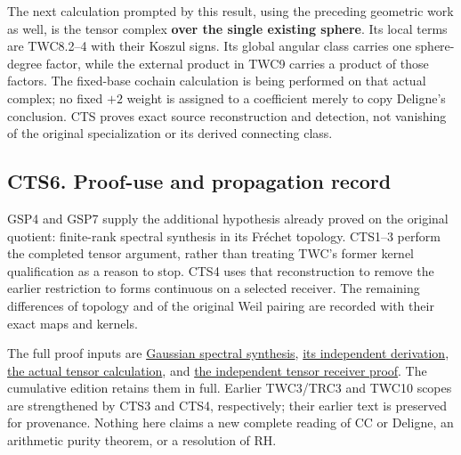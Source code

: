 The next calculation prompted by this result, using the preceding
geometric work as well, is the tensor complex \textbf{over the single
existing sphere}. Its local terms are TWC8.2--4 with their Koszul signs.
Its global angular class carries one sphere-degree factor, while the
external product in TWC9 carries a product of those factors. The
fixed-base cochain calculation is being performed on that actual
complex; no fixed \(+2\) weight is assigned to a coefficient merely to
copy Deligne's conclusion. CTS proves exact source reconstruction and
detection, not vanishing of the original specialization or its derived
connecting class.

\subsection{CTS6. Proof-use and propagation
record}\label{cts6.-proof-use-and-propagation-record}

GSP4 and GSP7 supply the additional hypothesis already proved on the
original quotient: finite-rank spectral synthesis in its Fréchet
topology. CTS1--3 perform the completed tensor argument, rather than
treating TWC's former kernel qualification as a reason to stop. CTS4
uses that reconstruction to remove the earlier restriction to forms
continuous on a selected receiver. The remaining differences of topology
and of the original Weil pairing are recorded with their exact maps and
kernels.

The full proof inputs are
\href{https://github.com/KokunoYumeto/zeta-function-research-reader/blob/main/workbenches/splitzero-tandem/continuations/20260925-full-source-tensor-and-original-divisor/gct/GAUSSIAN_SPECTRAL_SYNTHESIS.md}{Gaussian
spectral synthesis},
\href{https://github.com/KokunoYumeto/zeta-function-research-reader/blob/main/workbenches/splitzero-tandem/continuations/20260925-full-source-tensor-and-original-divisor/gct/GAUSSIAN_SPECTRAL_SYNTHESIS_INDEPENDENT.md}{its
independent derivation},
\href{https://github.com/KokunoYumeto/zeta-function-research-reader/blob/main/workbenches/splitzero-tandem/continuations/20260925-full-source-tensor-and-original-divisor/gct/ACTUAL_SPECIALIZATION_TENSOR_WEIGHT_COMPARISON.md}{the
actual tensor calculation}, and
\href{https://github.com/KokunoYumeto/zeta-function-research-reader/blob/main/workbenches/splitzero-tandem/continuations/20260925-full-source-tensor-and-original-divisor/gct/TENSOR_RECEIVER_INDEPENDENT_CHECK.md}{the
independent tensor receiver proof}. The cumulative edition retains them
in full. Earlier TWC3/TRC3 and TWC10 scopes are strengthened by CTS3 and
CTS4, respectively; their earlier text is preserved for provenance.
Nothing here claims a new complete reading of CC or Deligne, an
arithmetic purity theorem, or a resolution of RH.

